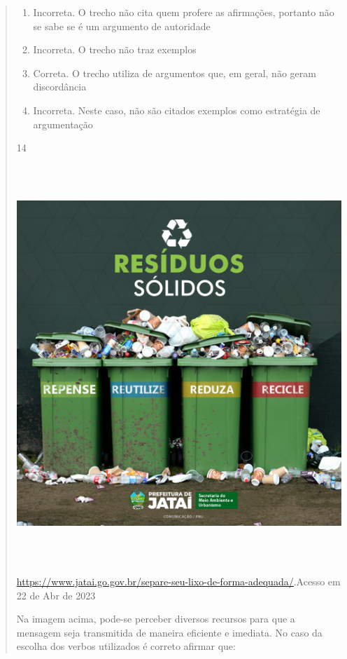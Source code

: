 {\begin{quote}
{\begin{itemize}
\begin{itemize}
\begin{enumerate}
\def\labelenumi{\arabic{enumi}.}
\item
  Incorreta. O trecho não cita quem profere as afirmações, portanto não
  se sabe se é um argumento de autoridade
\item
  Incorreta. O trecho não traz exemplos
\item
  Correta. O trecho utiliza de argumentos que, em geral, não geram
  discordância
\item
  Incorreta. Neste caso, não são citados exemplos como estratégia de
  argumentação
\end{enumerate}

\num{14}

\includegraphics[width=5.90551in,height=5.90278in]{./imgSAEB_7_POR/media/image19.png}

\href{https://www.jatai.go.gov.br/separe-seu-lixo-de-forma-adequada/}{\uline{https://www.jatai.go.gov.br/separe-seu-lixo-de-forma-adequada/}}.Acesso
em 22 de Abr de 2023

Na imagem acima, pode-se perceber diversos recursos para que a mensagem
seja transmitida de maneira eficiente e imediata. No caso da escolha dos
verbos utilizados é correto afirmar que:


\end{itemize}
\end{itemize}}
\end{quote}}

